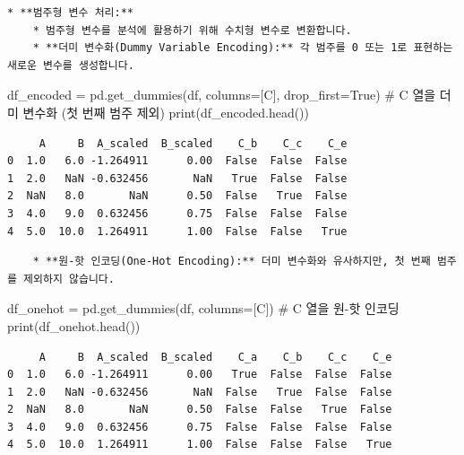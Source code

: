 \documentclass[
  letterpaper,
]{book}
\newenvironment{Shaded}{\begin{snugshade}}{\end{snugshade}}
\newcommand{\BuiltInTok}[1]{\textcolor[rgb]{0.00,0.23,0.31}{#1}}
\newcommand{\CommentTok}[1]{\textcolor[rgb]{0.37,0.37,0.37}{#1}}
\newcommand{\NormalTok}[1]{\textcolor[rgb]{0.00,0.23,0.31}{#1}}
\newcommand{\OperatorTok}[1]{\textcolor[rgb]{0.37,0.37,0.37}{#1}}
\newcommand{\StringTok}[1]{\textcolor[rgb]{0.13,0.47,0.30}{#1}}
\newcommand{\VariableTok}[1]{\textcolor[rgb]{0.07,0.07,0.07}{#1}}
\begin{document}
\begin{verbatim}
* **범주형 변수 처리:**
    * 범주형 변수를 분석에 활용하기 위해 수치형 변수로 변환합니다.
    * **더미 변수화(Dummy Variable Encoding):** 각 범주를 0 또는 1로 표현하는 새로운 변수를 생성합니다.
\end{verbatim}

\begin{Shaded}
\begin{Highlighting}[]
\NormalTok{    df\_encoded }\OperatorTok{=}\NormalTok{ pd.get\_dummies(df, columns}\OperatorTok{=}\NormalTok{[}\StringTok{\textquotesingle{}C\textquotesingle{}}\NormalTok{], drop\_first}\OperatorTok{=}\VariableTok{True}\NormalTok{) }\CommentTok{\# \textquotesingle{}C\textquotesingle{} 열을 더미 변수화 (첫 번째 범주 제외)}
    \BuiltInTok{print}\NormalTok{(df\_encoded.head())}
\end{Highlighting}
\end{Shaded}

\begin{verbatim}
     A     B  A_scaled  B_scaled    C_b    C_c    C_e
0  1.0   6.0 -1.264911      0.00  False  False  False
1  2.0   NaN -0.632456       NaN   True  False  False
2  NaN   8.0       NaN      0.50  False   True  False
3  4.0   9.0  0.632456      0.75  False  False  False
4  5.0  10.0  1.264911      1.00  False  False   True
\end{verbatim}

\begin{verbatim}
    * **원-핫 인코딩(One-Hot Encoding):** 더미 변수화와 유사하지만, 첫 번째 범주를 제외하지 않습니다.
\end{verbatim}

\begin{Shaded}
\begin{Highlighting}[]
\NormalTok{    df\_onehot }\OperatorTok{=}\NormalTok{ pd.get\_dummies(df, columns}\OperatorTok{=}\NormalTok{[}\StringTok{\textquotesingle{}C\textquotesingle{}}\NormalTok{]) }\CommentTok{\# \textquotesingle{}C\textquotesingle{} 열을 원{-}핫 인코딩}
    \BuiltInTok{print}\NormalTok{(df\_onehot.head())}
\end{Highlighting}
\end{Shaded}

\begin{verbatim}
     A     B  A_scaled  B_scaled    C_a    C_b    C_c    C_e
0  1.0   6.0 -1.264911      0.00   True  False  False  False
1  2.0   NaN -0.632456       NaN  False   True  False  False
2  NaN   8.0       NaN      0.50  False  False   True  False
3  4.0   9.0  0.632456      0.75  False  False  False  False
4  5.0  10.0  1.264911      1.00  False  False  False   True
\end{verbatim}
\end{document}
